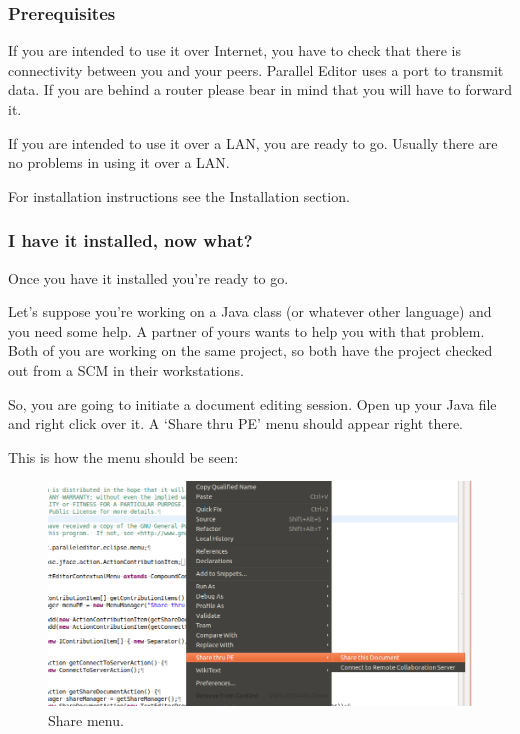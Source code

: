 \subsubsection{Prerequisites}

If you are intended to use it over Internet, you have to check that there is connectivity between
you and your peers. Parallel Editor uses a port to transmit data. If you are behind a router 
please bear in mind that you will have to forward it.

If you are intended to use it over a LAN, you are ready to go. Usually there are no problems in
using it over a LAN.

For installation instructions see the Installation section. %

\subsubsection{I have it installed, now what?}

Once you have it installed you're ready to go.

Let's suppose you're working on a Java class (or whatever other language) and you need some help. A 
partner of yours wants to help you with that problem. Both of you are working on the same project, so
both have the project checked out from a SCM in their workstations.

So, you are going to initiate a document editing session. Open up your Java file and right click over it. 
A `Share thru PE' menu should appear right there.

This is how the menu should be seen: 
\begin{figure}[!ht]
	\begin{center}
		\includegraphics[width=14cm]{contextual_menu.png}
		\caption{\label{share} Share menu.}
	\end{center}
\end{figure}

